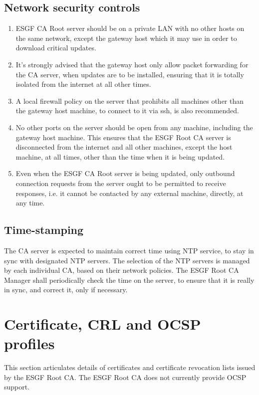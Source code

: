 \subsection{Network security controls}\label{network-security-controls}
\begin{enumerate}
\item ESGF CA Root server should be on a private LAN with no other hosts on the same network, except the gateway host which it may use in order to download critical updates. 
\item It's strongly advised that the gateway host only allow packet forwarding for the CA server, when updates are to be installed, ensuring that it is totally isolated from the internet at all other times. 
\item A local firewall policy on the server that prohibits all machines other than the gateway host machine, to connect to it via ssh, is also recommended. 
\item No other ports on the server should be open from any machine, including the gateway host machine. This ensures that the ESGF Root CA server is disconnected from the internet and all other machines, except the host machine, at all times, other than the time when it is being updated.
\item Even when the ESGF CA Root server is being updated, only outbound connection requests from the server ought to be  permitted to receive responses, i.e. it cannot be contacted by any external machine, directly, at any time.
\end{enumerate}

\subsection{Time-stamping}\label{time-stamping}

The CA server is expected to maintain correct time using NTP service, to stay in sync with designated NTP servers. The selection of the NTP servers is managed by each individual CA, based on their network policies. The ESGF Root CA Manager shall periodically check the time on the server, to ensure that it is really in sync, and correct it, only if necessary.

\section{Certificate, CRL and OCSP profiles}\label{certificate-crl-and-ocsp-profiles}

This section articulates details of certificates and certificate
revocation lists issued by the ESGF Root CA. The ESGF Root CA
does not currently provide OCSP support.

